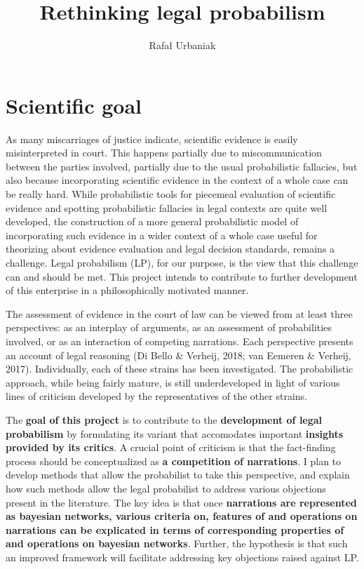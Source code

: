 \documentclass[11pt,dvipsnames,enabledeprecatedfontcommands]{scrartcl}
\title{Rethinking legal probabilism}
\author{Rafał Urbaniak}
\date{}
\begin{document}
\maketitle

\thispagestyle{empty}

\section{Scientific goal}\label{scientific-goal}

As many miscarriages of justice indicate, scientific evidence is easily
misinterpreted in court. This happens partially due to miscommunication
between the parties involved, partially due to the usual probabilistic
fallacies, but also because incorporating scientific evidence in the
context of a whole case can be really hard. While probabilistic tools
for piecemeal evaluation of scientific evidence and spotting
probabilistic fallacies in legal contexts are quite well developed, the
construction of a more general probabilistic model of incorporating such
evidence in a wider context of a whole case useful for theorizing about
evidence evaluation and legal decision standards, remains a challenge.
Legal probabilism (LP), for our purpose, is the view that this challenge
can and should be met. This project intends to contribute to further
development of this enterprise in a philosophically motivated manner.

The assessment of evidence in the court of law can be viewed from at
least three perspectives: as an interplay of arguments, as an assessment
of probabilities involved, or as an interaction of competing narrations.
Each perspective presents an account of legal reasoning (Di Bello \&
Verheij, 2018; van Eemeren \& Verheij, 2017). Individually, each of
these strains has been investigated. The probabilistic approach, while
being fairly mature, is still underdeveloped in light of various lines
of criticism developed by the representatives of the other strains.

The \textbf{goal of this project} is to contribute to the
\textbf{development of legal probabilism} by formulating its variant
that accomodates important \textbf{insights provided by its critics}. A
crucial point of criticism is that the fact-finding process should be
conceptualized as \textbf{a competition of narrations}. I plan to
develop methods that allow the probabilist to take this perspective, and
explain how such methods allow the legal probabilist to address various
objections present in the literature. The key idea is that once
\textbf{narrations are represented as bayesian networks, various criteria on,  features of  and operations on narrations can be explicated in terms of corresponding properties of and operations on bayesian networks}.
Further, the hypothesis is that such an improved framework will
facilitate addressing key objections raised against LP.
\end{document}
